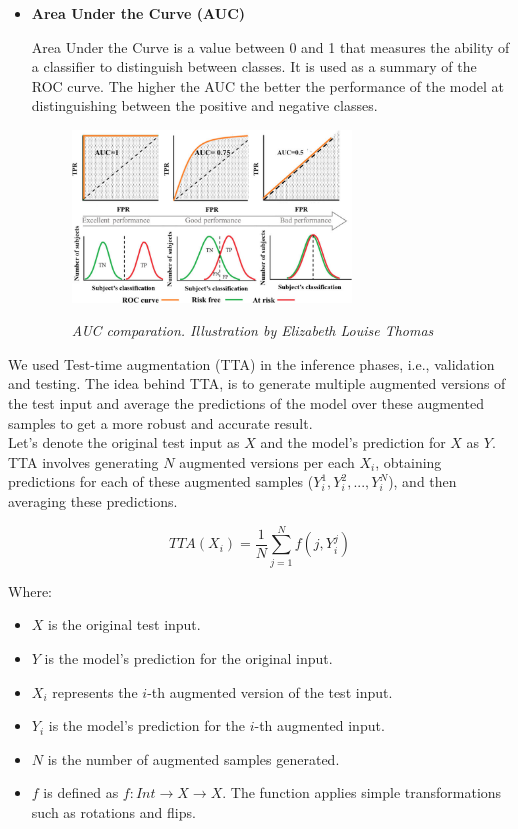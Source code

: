 \begin{itemize}
  \item {\bf Area Under the Curve (AUC)}

  Area Under the Curve is a value between 0 and 1 that measures the ability of
  a classifier to distinguish between classes. It is used as a summary of the
  ROC curve. The higher the AUC the better the performance of the model at
  distinguishing between the positive and negative classes.

  \begin{figure}[H]
    \centering
    \includegraphics[width=0.7\textwidth]{imatges/validation-strategy/auc.png}
    \caption[AUC-ROC performance]{\textit{AUC comparation. Illustration by Elizabeth Louise Thomas}}
    {\label{fig:auc-roc}}
  \end{figure}

\end{itemize}

We used Test-time augmentation (TTA) \cite{TTA} in the inference phases, i.e., validation
and testing. The idea behind TTA, is to generate multiple augmented versions of
the test input and average the predictions of the model over these augmented
samples to get a more robust and accurate result. \\

Let's denote the original test input as \(X\) and the model's prediction for
\(X\) as \(Y\). TTA involves generating \(N\) augmented versions per each
\(X_i\), obtaining predictions for each of these augmented samples (\(Y_i^1, Y_i^2,
..., Y_i^N\)), and then averaging these predictions.

\[ TTA(X_i) = \frac{1}{N} \sum_{j=1}^{N} f(j, Y_i^j) \]

Where:

\begin{itemize}
  \item \(X\) is the original test input.
  \item \(Y\) is the model's prediction for the original input.
  \item \(X_i\) represents the \(i\)-th augmented version of the test input.
  \item \(Y_i\) is the model's prediction for the \(i\)-th augmented input.
  \item \(N\) is the number of augmented samples generated.
  \item \(f\) is defined as \(f: Int \rightarrow X \rightarrow X\). The
    function applies simple transformations such as rotations and flips.
\end{itemize}


